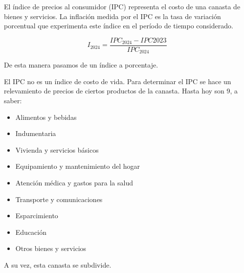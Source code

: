 El índice de precios al consumidor (IPC) 
representa el costo de una canasta de bienes y servicios.
La inflación medida por el IPC es la tasa de variación porcentual 
que experimenta este índice en el período de tiempo considerado.

\begin{equation*}
    I_{2024} = \frac{IPC_{2024}-IPC{2023}}{IPC_{2024}}
\end{equation*}

De esta manera pasamos de un índice a porcentaje.

El IPC no es un índice de costo de vida.
Para determinar el IPC se hace un relevamiento de precios 
de ciertos productos de la canasta.
Hasta hoy son 9, a saber:
\begin{itemize}
    \item Alimentos y bebidas
    \item Indumentaria
    \item Vivienda y servicios básicos
    \item Equipamiento y mantenimiento del hogar
    \item Atención médica y gastos para la salud 
    \item Transporte y comunicaciones
    \item Esparcimiento
    \item Educación
    \item Otros bienes y servicios 
\end{itemize}

A su vez,
esta canasta se subdivide.
